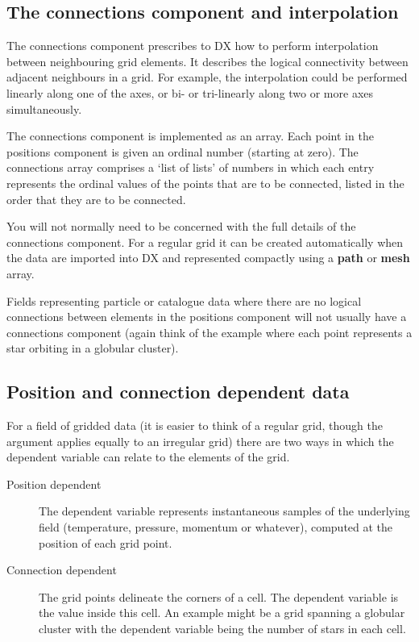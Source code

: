 \documentclass[twoside,11pt]{starlink}
\begin{document}
\subsection{\label{CONINT}The connections component and interpolation}


The connections component prescribes to DX how to perform interpolation
between neighbouring grid elements. It describes the logical
connectivity between adjacent neighbours in a grid. For example, the
interpolation could be performed linearly along one of the axes, or
bi- or tri-linearly along two or more axes simultaneously.

The connections component is implemented as an array. Each point in the
positions component is given an ordinal number (starting at zero). The
connections array comprises a `list of lists' of numbers in which each
entry represents the ordinal values of the points that are to be
connected, listed in the order that they are to be connected.

You will not normally need to be concerned with the full details of the
connections component. For a regular grid it can be created
automatically when the data are imported into DX and represented
compactly using a \textbf{path} or \textbf{mesh} array.

Fields representing particle or catalogue data where there are no
logical connections between elements in the positions component will
not usually have a connections component (again think of the example
where each point represents a star orbiting in a globular cluster).

\subsection{\label{POSCONDEP}Position and connection dependent data}


For a field of gridded data (it is easier to think of a regular grid,
though the argument applies equally to an irregular grid) there are two
ways in which the dependent variable can relate to the elements of the
grid.

\begin{description}

  \item[Position dependent] The dependent variable represents
   instantaneous samples of the underlying field (temperature, pressure,
   momentum or whatever), computed at the position of each grid point.

  \item[Connection dependent] The grid points delineate the corners
   of a cell. The dependent variable is the value inside this cell.
   An example might be a grid spanning a globular cluster with the
   dependent variable being the number of stars in each cell.

\end{description}
\end{document}
